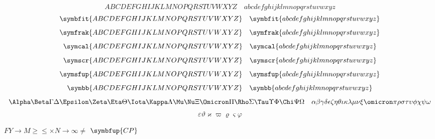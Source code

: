 \documentclass[12pt, ThmSectionNumbering]{CrispyNotes}
\begin{document}
    \begin{equation*}
        ABCDEFGHIJKLMNOPQRSTUVWXYZ \quad abcdefghijklmnopqrstuvwxyz
    \end{equation*}
    \begin{equation*}
        \symbfit{ABCDEFGHIJKLMNOPQRSTUVWXYZ} \quad \symbfit{abcdefghijklmnopqrstuvwxyz}
    \end{equation*}
    \begin{equation*}
        \symfrak{ABCDEFGHIJKLMNOPQRSTUVWXYZ} \quad \symfrak{abcdefghijklmnopqrstuvwxyz}
    \end{equation*}
    \begin{equation*}
        \symcal{ABCDEFGHIJKLMNOPQRSTUVWXYZ} \quad \symcal{abcdefghijklmnopqrstuvwxyz}
    \end{equation*}
    \begin{equation*}
        \symscr{ABCDEFGHIJKLMNOPQRSTUVWXYZ} \quad \symscr{abcdefghijklmnopqrstuvwxyz}
    \end{equation*}
    \begin{equation*}
        \symsfup{ABCDEFGHIJKLMNOPQRSTUVWXYZ} \quad \symsfup{abcdefghijklmnopqrstuvwxyz}
    \end{equation*}
    \begin{equation*}
        \symbb{ABCDEFGHIJKLMNOPQRSTUVWXYZ} \quad \symbb{abcdefghijklmnopqrstuvwxyz}
    \end{equation*}
    \begin{equation*}
        \Alpha\Beta\Gamma\Delta\Epsilon\Zeta\Eta\Theta\Iota\Kappa\Lambda\Mu\Nu\Xi\Omicron\Pi\Rho\Sigma\Tau\Upsilon\Phi\Chi\Psi\Omega \quad \alpha\beta\gamma\delta\epsilon\zeta\eta\theta\iota\kappa\lambda\mu\nu\xi\omicron\pi\rho\sigma\tau\upsilon\phi\chi\psi\omega
    \end{equation*}
    \begin{equation*}
      \varepsilon\vartheta\varkappa\varpi\varrho\varsigma\varphi
    \end{equation*}

    \(FY\to M\)\(\geq \leq \times\)\(N\to\infty \neq\) \(\symbfup{CP}\)
\end{document}
